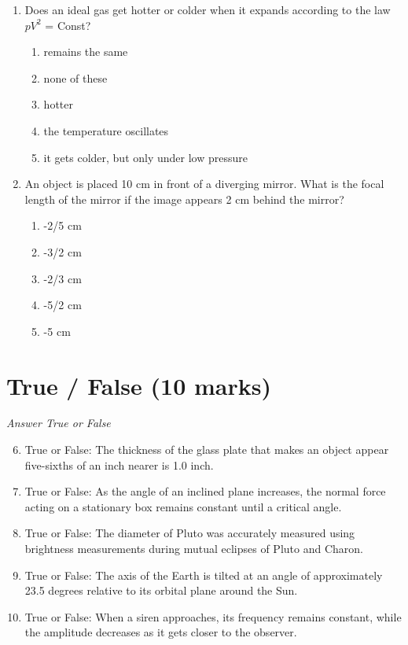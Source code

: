 \documentclass[12pt]{article}
\begin{document}
\begin{enumerate}[label=\arabic*.]
\begin{enumerate}[label=(\alph*)]
    \item only when the charge is at rest
\end{enumerate}
\item Does an ideal gas get hotter or colder when it expands according to the law $pV^2$ = Const?
\begin{enumerate}[label=(\alph*)]
    \item remains the same
    \item none of these
    \item hotter
    \item the temperature oscillates
    \item it gets colder, but only under low pressure
\end{enumerate}
\item An object is placed 10 cm in front of a diverging mirror. What is the focal length of the mirror if the image appears 2 cm behind the mirror?
\begin{enumerate}[label=(\alph*)]
    \item -2/5 cm
    \item -3/2 cm
    \item -2/3 cm
    \item -5/2 cm
    \item -5 cm
\end{enumerate}
\end{enumerate}

\section*{True / False (10 marks)}
\textit{Answer True or False}
\begin{enumerate}[label=\arabic*.]
\setcounter{enumi}{5}
\item True or False: The thickness of the glass plate that makes an object appear five-sixths of an inch nearer is 1.0 inch.
\item True or False: As the angle of an inclined plane increases, the normal force acting on a stationary box remains constant until a critical angle.
\item True or False: The diameter of Pluto was accurately measured using brightness measurements during mutual eclipses of Pluto and Charon.
\item True or False: The axis of the Earth is tilted at an angle of approximately 23.5 degrees relative to its orbital plane around the Sun.
\item True or False: When a siren approaches, its frequency remains constant, while the amplitude decreases as it gets closer to the observer.
\end{enumerate}
\end{document}
